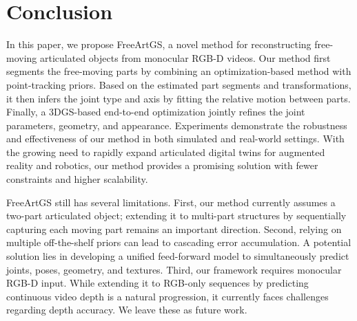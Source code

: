 \section{Conclusion}
In this paper, we propose FreeArtGS, a novel method for reconstructing free-moving articulated objects from monocular RGB-D videos. Our method first segments the free-moving parts by combining an optimization-based method with point-tracking priors. Based on the estimated part segments and transformations, it then infers the joint type and axis by fitting the relative motion between parts. Finally, a 3DGS-based end-to-end optimization jointly refines the joint parameters, geometry, and appearance. Experiments demonstrate the robustness and effectiveness of our method in both simulated and real-world settings. With the growing need to rapidly expand articulated digital twins for augmented reality and robotics, our method provides a promising solution with fewer constraints and higher scalability.

FreeArtGS still has several limitations. First, our method currently assumes a two-part articulated object; extending it to multi-part structures by sequentially capturing each moving part remains an important direction. Second, relying on multiple off-the-shelf priors can lead to cascading error accumulation. A potential solution lies in developing a unified feed-forward model to simultaneously predict joints, poses, geometry, and textures. Third, our framework requires monocular RGB-D input. While extending it to RGB-only sequences by predicting continuous video depth is a natural progression, it currently faces challenges regarding depth accuracy. We leave these as future work.

